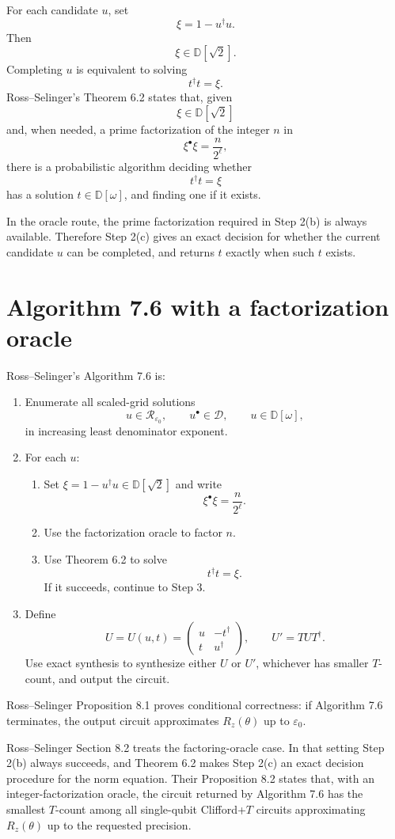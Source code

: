 \documentclass[11pt]{article}
\newcommand{\D}{\mathbb D}
\newcommand{\Dw}{\mathbb D[\omega]}
\newcommand{\eps}{\varepsilon}
\newcommand{\mat}[1]{\begin{pmatrix}#1\end{pmatrix}}
\begin{document}
For each candidate $u$, set
\[
  \xi=1-u^\dagger u.
\]
Then
\[
  \xi\in\D[\sqrt2].
\]
Completing $u$ is equivalent to solving
\[
  t^\dagger t=\xi.
\]
Ross--Selinger's Theorem 6.2 states that, given
\[
  \xi\in\D[\sqrt2]
\]
and, when needed, a prime factorization of the integer $n$ in
\[
  \xi^\bullet\xi=\frac n{2^\ell},
\]
there is a probabilistic algorithm deciding whether
\[
  t^\dagger t=\xi
\]
has a solution $t\in\Dw$, and finding one if it exists.

In the oracle route, the prime factorization required in Step 2(b) is always available. Therefore Step 2(c) gives an exact decision for whether the current candidate $u$ can be completed, and returns $t$ exactly when such $t$ exists.

\section{Algorithm 7.6 with a factorization oracle}

Ross--Selinger's Algorithm 7.6 is:
\begin{enumerate}[label=\textbf{\arabic*.}]
\item Enumerate all scaled-grid solutions
\[
  u\in\mathcal R_{\eps_0},
  \qquad
  u^\bullet\in\mathcal D,
  \qquad
  u\in\Dw,
\]
in increasing least denominator exponent.
\item For each $u$:
  \begin{enumerate}[label=(\alph*)]
  \item Set $\xi=1-u^\dagger u\in\D[\sqrt2]$ and write
  \[
    \xi^\bullet\xi=\frac n{2^\ell}.
  \]
  \item Use the factorization oracle to factor $n$.
  \item Use Theorem 6.2 to solve
  \[
    t^\dagger t=\xi.
  \]
  If it succeeds, continue to Step 3.
  \end{enumerate}
\item Define
\[
  U=U(u,t)=\mat{u&-t^\dagger\\t&u^\dagger},
  \qquad
  U'=TUT^\dagger.
\]
Use exact synthesis to synthesize either $U$ or $U'$, whichever has smaller $T$-count, and output the circuit.
\end{enumerate}

Ross--Selinger Proposition 8.1 proves conditional correctness: if Algorithm 7.6 terminates, the output circuit approximates $R_z(\theta)$ up to $\eps_0$.

Ross--Selinger Section 8.2 treats the factoring-oracle case. In that setting Step 2(b) always succeeds, and Theorem 6.2 makes Step 2(c) an exact decision procedure for the norm equation. Their Proposition 8.2 states that, with an integer-factorization oracle, the circuit returned by Algorithm 7.6 has the smallest $T$-count among all single-qubit Clifford+$T$ circuits approximating $R_z(\theta)$ up to the requested precision.
\end{document}
